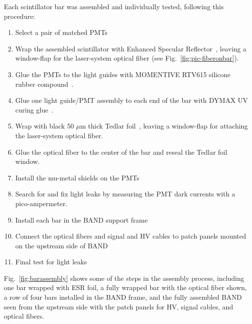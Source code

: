 \documentclass[3p,final,twocolumn]{elsarticle}
\begin{document}
Each scintillator bar was assembled and individually tested, following this procedure:
\begin{enumerate}
\item Select a pair of matched PMTs
\item Wrap the assembled scintillator with Enhanced Specular Reflector~\cite{3MESR}, leaving a window-flap for the laser-system optical fiber (see Fig.~\ref{fig:pic-fiberonbar}).
\item Glue the PMTs to the light guides with MOMENTIVE RTV615 silicone rubber compound~\cite{softglue}.
\item Glue one light guide/PMT assembly to each end of the bar with DYMAX
  UV curing glue~\cite{uvglue}.
\item Wrap with black 50 $\mu$m thick Tedlar\textregistered{} foil~\cite{tedlarfoil}, leaving a
  window-flap for attaching the laser-system optical fiber.
\item Glue the optical fiber to the center of the bar and reseal the Tedlar\textregistered{} foil window.
\item Install the mu-metal shields on the PMTs 
\item Search for and fix light leaks by measuring the PMT dark currents with a pico-ampermeter.
\item Install each bar in the BAND support frame
\item Connect the optical fibers and signal and HV cables to patch panels mounted on the upstream side of BAND
\item Final test for light leaks
\end{enumerate}
Fig.~\ref{fig:barassembly} shows some of the steps in the assembly process,
including one bar wrapped with ESR foil, a fully wrapped bar with the
optical fiber shown, a row of four bars installed in the BAND frame,
and the fully assembled BAND seen from the upstream side with the
patch panels for HV, signal cables, and optical fibers.
\end{document}
